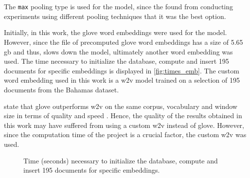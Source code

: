 \section{\infersent{}}\label{sec:evaluation-inferSent}

The \texttt{max} pooling type is used for the \infersent{} model, since the \citeauthor{inferSent2018} 
found from conducting experiments using different pooling techniques
that it was the best option.

Initially, in this work, the \ac{glove} word embeddings were used for the \infersent{} model.
However, since the file of precomputed \acs{glove} word embeddings has a size of 5.65 \ac{gb} and thus,
slows down the model, ultimately another word embedding was used.
The time necessary to initialize the database, compute and insert 195 documents for specific embeddings is displayed in \autoref{fig:times_emb}.
The custom word embedding used in this work is a \ac{w2v} model trained on a selection of 195 documents from the Bahamas dataset.

\citeauthor{glove2014} state that \acs{glove} outperforms \ac{w2v} on the same corpus, 
vocabulary and window size in terms of quality and speed \cite{glove2014}.
Hence, the quality of the results obtained in this work may have suffered from using a custom \ac{w2v} instead of \acs{glove}.
However, since the computation time of the project is a crucial factor, the custom \ac{w2v} was used.

\begin{figure}%
    \centering
    \qquad
    \caption{Time (seconds) necessary to initialize the database, compute and insert 195 documents for specific embeddings.}%
    \label{fig:times_emb}%
\end{figure}
